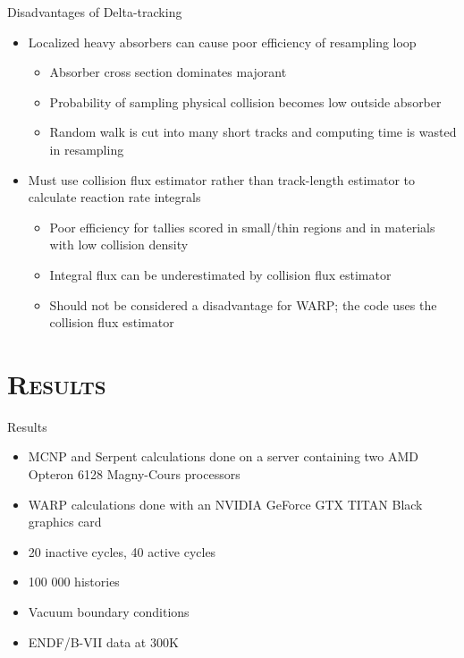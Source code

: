 \documentclass[xcolor=x11names, compress]{beamer}
\renewcommand{\(}{\begin{columns}}
\renewcommand{\)}{\end{columns}}
\newcommand{\<}[1]{\begin{column}{#1}}
\renewcommand{\>}{\end{column}}
\begin{document}
\begin{frame}{Disadvantages of Delta-tracking \cite{serpent}}
	\begin{itemize}
        \item{Localized heavy absorbers can cause poor efficiency of resampling loop}
                \begin{itemize}
                \item{Absorber cross section dominates majorant}
                \item{Probability of sampling physical collision becomes low outside absorber}
                \item{Random walk is cut into many short tracks and computing time is wasted in 
		resampling}
                \end{itemize}
	\pause
	\vspace*{1 em}
	\item{Must use collision flux estimator rather than track-length estimator to calculate reaction 
	rate integrals}
		\begin{itemize}
		\item{Poor efficiency for tallies scored in small/thin regions and in materials with low 
		collision density}
		\item{Integral flux can be underestimated by collision flux estimator}
		\item{Should not be considered a disadvantage for WARP; the code uses the collision flux 
		estimator}
		\end{itemize}
	\end{itemize}
\end{frame}


\section{\scshape Results}
\begin{frame}{Results}
	\begin{itemize}
	\item{MCNP and Serpent calculations done on a server containing two AMD Opteron 6128 Magny-Cours 
	processors}
	\item{WARP calculations done with an NVIDIA GeForce GTX TITAN Black graphics card}
	\item{20 inactive cycles, 40 active cycles}
	\item{100 000 histories}
	\item{Vacuum boundary conditions}
	\item{ENDF/B-VII data at 300K}
	\end{itemize}
\end{frame}
\end{document}
